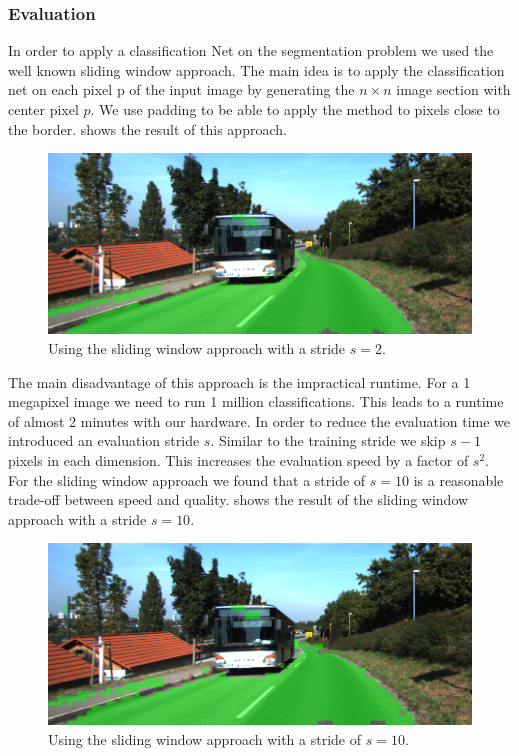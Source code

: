 \subsubsection{Evaluation}

In order to apply a classification Net on the segmentation problem we used the well known sliding window approach. The main idea is to apply the classification net on each pixel p of the input image by generating the $n \times n$ image section with center pixel $p$. We use padding to be able to apply the method to pixels close to the border.  shows the result of this approach.

\begin{figure}[H]
	\centering
	\includegraphics[width=\columnwidth]{figures/models/testing2-um_32_sliding_stride2.png}
	\caption{Using the sliding window approach with a stride $s=2$.}
	\label{fig:stride2}
\end{figure}

The main disadvantage of this approach is the impractical runtime. For a 1 megapixel image we need to run 1 million classifications. This leads to a runtime of almost 2 minutes with our hardware. In order to reduce the evaluation time we introduced an evaluation stride $s$. Similar to the training stride we skip $s-1$ pixels in each dimension. This increases the evaluation speed by a factor of $s^2$. For the sliding window approach we found that a stride of $s = 10$ is a reasonable trade-off between speed and quality.  shows the result of the sliding window approach with a stride $s=10$.



\begin{figure}[H]
	\centering
	\includegraphics[width=\columnwidth]{figures/models/testing2-um_32_sliding_stride10.png}
	\caption{Using the sliding window approach with a stride of $s=10$.}
	\label{fig:stride10}
\end{figure}


